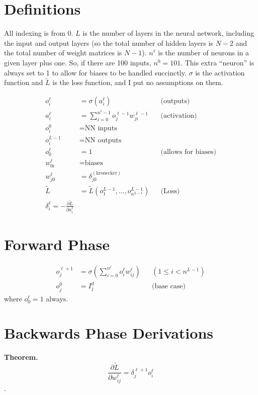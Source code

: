 \documentclass[letterpaper]{article}
\begin{document}
\section{Definitions}

All indexing is from 0. 
$L$ is the number of layers in the neural network, including the input and output layers (so the total number of hidden layers is $N-2$ and the total number of weight matrices is $N-1$). $n^{\ell}$ is the number of neurons in a given layer plus one. So, if there are 100 inputs, $n^0=101$. This extra ``neuron'' is always set to 1 to allow for biases to be handled succinctly. $\sigma$ is the activation function and $\tilde{L}$ is the loss function, and I put no assumptions on them.

\begin{align*}
    o_i^\ell&=\sigma(a_i^\ell) &&\text{(outputs)}\\
    a_i^\ell&=\sum_{i=0}^{n^\ell-1}o_j^{\ell-1}w_{ji}^{\ell-1} &&\text{(activation)}\\
    o_i^0&=\text{NN inputs}\\
    o_i^{L-1}&=\text{NN outputs}\\
    o_0^{\ell}&=1 && \text{(allows for biases)}\\
    w_{0i}^\ell&=\text{biases}\\
    w_{j0}^\ell&=\delta^{(\text{kronecker})}_{j0}\\
    \tilde{L}&=\tilde{L}(o_1^{L-1},\ldots,o_{n^{L-1}}^{L-1}) & & \text{(Loss)}\\
    \delta_i^\ell=-\frac{\partial \tilde{L}}{\partial a_i^\ell}
\end{align*}

\section{Forward Phase}

\begin{align*}
o_j^{\ell+1}&=\sigma\left(\sum_{i=0}^{n^\ell} o_i^{\ell} w_{ij}^\ell\right) & & (1\leq i < n^{L-1})\\
o_j^{0}&=I_j^d& & \text{(base case)}
\end{align*}
where $o^\ell_0=1$ always.

\section{Backwards Phase Derivations}

{\bf Theorem.} $$\frac{\partial \tilde L}{\partial  w_{ij}^\ell}=\delta_{j}^{\ell+1} o_i^\ell$$.
\end{document}
